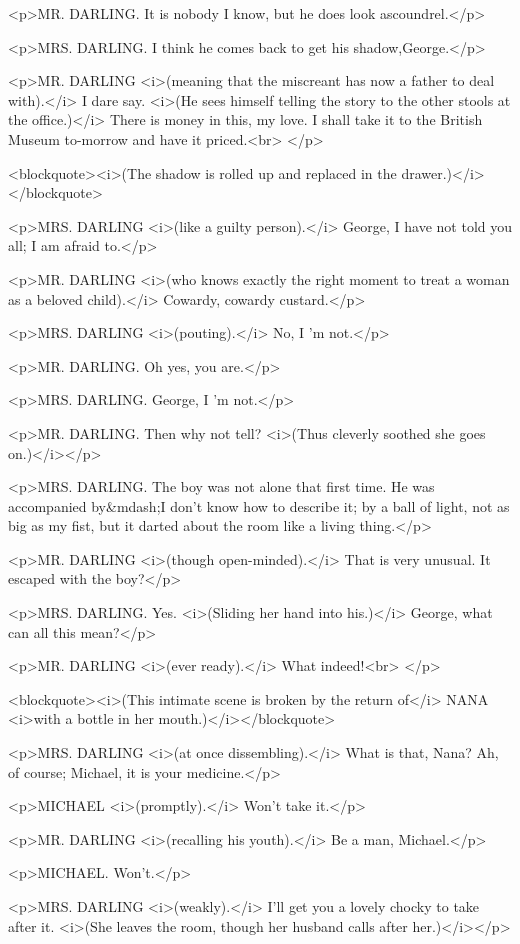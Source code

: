 <p>MR. DARLING. It is nobody I know, but he does look ascoundrel.</p>

<p>MRS. DARLING. I think he comes back to get his shadow,George.</p>

<p>MR. DARLING <i>(meaning that the miscreant has now a father to
deal with).</i> I dare say. <i>(He sees himself telling the story to
the other stools at the office.)</i> There is money in this, my love.
I shall take it to the British Museum to-morrow and have it
priced.<br>
</p>

<blockquote><i>(The shadow is rolled up and replaced in the
drawer.)</i></blockquote>

<p>MRS. DARLING <i>(like a guilty person).</i> George, I have not
told you all; I am afraid to.</p>

<p>MR. DARLING <i>(who knows exactly the right moment to treat a
woman as a beloved child).</i> Cowardy, cowardy custard.</p>

<p>MRS. DARLING <i>(pouting).</i> No, I 'm not.</p>

<p>MR. DARLING. Oh yes, you are.</p>

<p>MRS. DARLING. George, I 'm not.</p>

<p>MR. DARLING. Then why not tell? <i>(Thus cleverly soothed she goes
on.)</i></p>

<p>MRS. DARLING. The boy was not alone that first time. He was
accompanied by&mdash;I don't know how to describe it; by a ball of
light, not as big as my fist, but it darted about the room like a
living thing.</p>

<p>MR. DARLING <i>(though open-minded).</i> That is very unusual. It
escaped with the boy?</p>

<p>MRS. DARLING. Yes. <i>(Sliding her hand into his.)</i> George,
what can all this mean?</p>

<p>MR. DARLING <i>(ever ready).</i> What indeed!<br>
</p>

<blockquote><i>(This intimate scene is broken by the return of</i>
NANA <i>with a bottle in her mouth.)</i></blockquote>

<p>MRS. DARLING <i>(at once dissembling).</i> What is that, Nana? Ah,
of course; Michael, it is your medicine.</p>

<p>MICHAEL <i>(promptly).</i> Won't take it.</p>

<p>MR. DARLING <i>(recalling his youth).</i> Be a man, Michael.</p>

<p>MICHAEL. Won't.</p>

<p>MRS. DARLING <i>(weakly).</i> I'll get you a lovely chocky to take
after it. <i>(She leaves the room, though her husband calls after
her.)</i></p>


